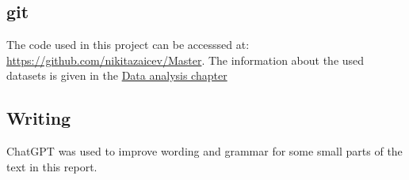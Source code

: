 \subsection{\gls{git}}

The code used in this project can be accesssed at: \url{https://github.com/nikitazaicev/Master}. The information about the used datasets is given in the \hyperref[sec:dataanalysis]{Data analysis chapter}

\subsection{Writing}

ChatGPT was used to improve wording and grammar for some small parts of the text in this report.